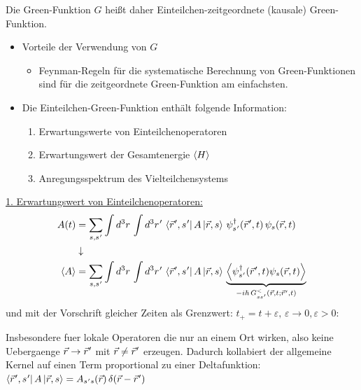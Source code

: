 Die Green-Funktion \(G\) heißt daher Einteilchen-zeitgeordnete (kausale) Green-Funktion.
\begin{itemize}
  \item Vorteile der Verwendung von \(G\)
        \begin{itemize}
          \item Feynman-Regeln für die systematische Berechnung von Green-Funktionen sind für die zeitgeordnete Green-Funktion am
                einfachsten.
        \end{itemize}
  \item Die Einteilchen-Green-Funktion enthält folgende Information:
        \begin{enumerate}
          \item Erwartungswerte von Einteilchenoperatoren
          \item Erwartungswert der Gesamtenergie \(\left\langle H\right\rangle\)
          \item Anregungsspektrum des Vielteilchensystems
        \end{enumerate}
\end{itemize}

\underline{1. Erwartungswert von Einteilchenoperatoren:}
\begin{equation}
  \begin{aligned}
    A(t)    & =\sum_{s,s\mkern1mu'}\int d^3r\,\int d^3r\mkern1mu'\,\left\langle\vec{r}\mkern1mu',s\mkern1mu'\right| A \left|\vec{r},s\right\rangle\,\psi^{\dagger}_{s\mkern1mu'}(\vec{r}\mkern1mu',t)\,\psi_s(\vec{r},t) \\
            & \downarrow                                                                                                                                                                       \\
    \left\langle A\right\rangle & =\sum_{s,s\mkern1mu'}\int d^3r\,\int d^3r\mkern1mu'\,\left\langle\vec{r}\mkern1mu',s\mkern1mu'\right| A \left|\vec{r},s\right\rangle\,
    \underbrace{\left\langle\psi^{\dagger}_{s\mkern1mu'}(\vec{r}\mkern1mu',t)\psi_s(\vec{r},t)\right\rangle}_{-i\hbar\,G^{<}_{ss\mkern1mu'}(\vec{r},t;\vec{r}\mkern1mu',t)}
  \end{aligned}
\end{equation}
und mit der Vorschrift gleicher Zeiten als Grenzwert:
\(t_{+}=t+\varepsilon,\,\varepsilon\to 0, \varepsilon > 0\):

Insbesondere fuer lokale Operatoren die nur an einem Ort wirken, also keine Uebergaenge $\vec{r}\to \vec{r}\mkern1mu'$
mit $\vec{r}\neq \vec{r}\mkern1mu'$ erzeugen. Dadurch kollabiert der allgemeine Kernel auf einen Term proportional zu
einer Deltafunktion: $ \left\langle\vec{r}\mkern1mu',s\mkern1mu'\right| A \left|\vec{r},s\right\rangle =
  A_{s\mkern1mu's}(\vec{r})\,\delta(\vec{r}-\vec{r}\mkern1mu')$

